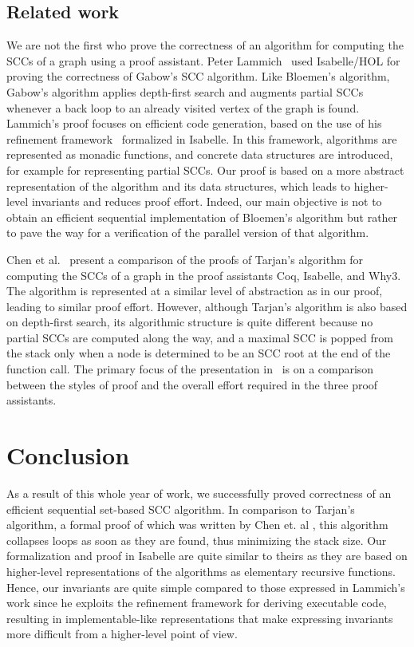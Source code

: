 \documentclass[sigplan,10pt,anonymous,review]{acmart}
\begin{document}
\subsection{Related work}
\label{sec:related}

We are not the first who prove the correctness of an algorithm for computing the SCCs of a graph using a proof assistant. Peter Lammich~\cite{lammich:gabow} used Isabelle/HOL for proving the correctness of Gabow's SCC algorithm. Like Bloemen's algorithm, Gabow's algorithm applies depth-first search and augments partial SCCs whenever a back loop to an already visited vertex of the graph is found. Lammich's proof focuses on efficient code generation, based on the use of his refinement framework~\cite{lammich:refinement} formalized in Isabelle. In this framework, algorithms are represented as monadic functions, and concrete data structures are introduced, for example for representing partial SCCs. Our proof is based on a more abstract representation of the algorithm and its data structures, which leads to higher-level invariants and reduces proof effort. Indeed, our main objective is not to obtain an efficient sequential implementation of Bloemen's algorithm but rather to pave the way for a verification of the parallel version of that algorithm.

Chen et al.~\cite{chen:tarjan} present a comparison of the proofs of Tarjan's algorithm for computing the SCCs of a graph in the proof assistants Coq, Isabelle, and Why3. The algorithm is represented at a similar level of abstraction as in our proof, leading to similar proof effort. However, although Tarjan's algorithm is also based on depth-first search, its algorithmic structure is quite different because no partial SCCs are computed along the way, and a maximal SCC is popped from the stack only when a node is determined to be an SCC root at the end of the function call. The primary focus of the presentation in~\cite{chen:tarjan} is on a comparison between the styles of proof and the overall effort required in the three proof assistants.


\section{Conclusion}
\label{sec:conclusion}


As a result of this whole year of work, we successfully proved correctness of an efficient sequential set-based SCC algorithm. In comparison to Tarjan's algorithm, a formal proof of which was written by Chen et. al \cite{chen:tarjan}, this algorithm collapses loops as soon as they are found, thus minimizing the stack size. Our formalization and  proof in Isabelle are quite similar to theirs as they are based on higher-level representations of the algorithms as elementary recursive functions. Hence, our invariants are quite simple compared to those expressed in Lammich's work \cite{lammich:gabow} since he exploits the refinement framework for deriving executable code, resulting in implementable-like representations that make expressing invariants more difficult from a higher-level point of view.
\end{document}
